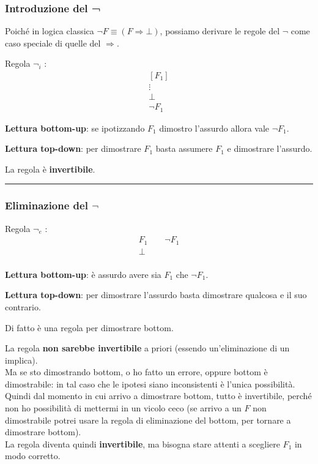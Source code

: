 \documentclass[
  a4paper,
]{article}
\begin{document}
\hypertarget{introduzione-del}{%
\subsubsection{Introduzione del ¬}\label{introduzione-del}}

Poiché in logica classica \(\neg F \equiv (F \Rightarrow \bot)\),
possiamo derivare le regole del \(\neg\) come caso speciale di quelle
del \(\Rightarrow\).

Regola \(\neg_i\) : \[
\begin{matrix} 
[F_1] \\
\vdots \\
\bot \\
\hline
\neg F_1 
\end{matrix}
\]

\textbf{Lettura bottom-up}: se ipotizzando \(F_1\) dimostro l'assurdo
allora vale \(\neg F_1\).

\textbf{Lettura top-down}: per dimostrare \(F_1\) basta assumere \(F_1\)
e dimostrare l'assurdo.

La regola è \textbf{invertibile}.

\par\noindent\rule{\linewidth}{0.4pt}\par\vspace{6pt}

\hypertarget{eliminazione-del-neg}{%
\subsubsection{\texorpdfstring{Eliminazione del
\(\neg\)}{Eliminazione del \textbackslash neg}}\label{eliminazione-del-neg}}

Regola \(\neg_e\) : \[
\begin{matrix} 
F_1 \quad\quad \neg F_1 \\
\hline
\bot \\
\end{matrix}
\]

\textbf{Lettura bottom-up}: è assurdo avere sia \(F_1\) che
\(\neg F_1\).

\textbf{Lettura top-down}: per dimostrare l'assurdo basta dimostrare
qualcosa e il suo contrario.

Di fatto è una regola per dimostrare bottom.

La regola \textbf{non sarebbe invertibile} a priori (essendo
un'eliminazione di un implica).\\
Ma se sto dimostrando bottom, o ho fatto un errore, oppure bottom è
dimostrabile: in tal caso che le ipotesi siano inconsistenti è l'unica
possibilità. Quindi dal momento in cui arrivo a dimostrare bottom, tutto
è invertibile, perché non ho possibilità di mettermi in un vicolo ceco
(se arrivo a un \(F\) non dimostrabile potrei usare la regola di
eliminazione del bottom, per tornare a dimostrare bottom).\\
La regola diventa quindi \textbf{invertibile}, ma bisogna stare attenti
a scegliere \(F_1\) in modo corretto.
\end{document}
